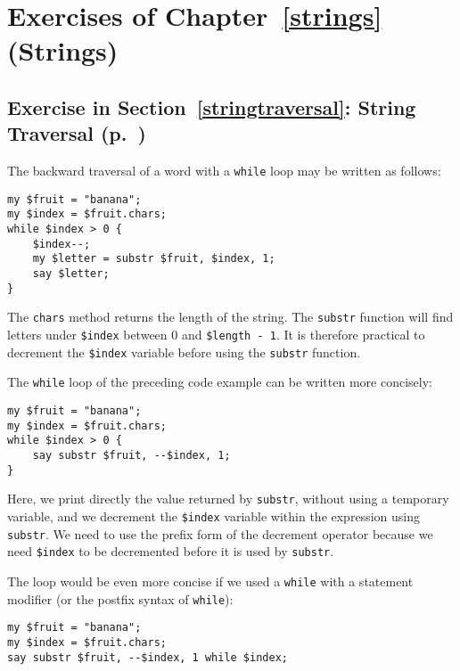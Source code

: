 \section{Exercises of Chapter~\ref{strings} (Strings)}

\subsection{Exercise in Section~\ref{stringtraversal}: String Traversal (p.~\pageref{stringtraversal})}
\label{sol_stringtraversal}

The backward traversal of a word with a {\tt while} loop may
be written as follows:

\begin{verbatim}
my $fruit = "banana";
my $index = $fruit.chars;
while $index > 0 { 
    $index--;
    my $letter = substr $fruit, $index, 1; 
    say $letter; 
}
\end{verbatim}
%

The {\tt chars} method returns the length of the string. The 
{\tt substr} function will find letters under \verb'$index' 
between 0 and \verb'$length - 1'. It is therefore practical 
to decrement the \verb'$index' variable before using the
{\tt substr} function. 

The \verb'while' loop of the preceding code example can be 
written more concisely:

\begin{verbatim}
my $fruit = "banana";
my $index = $fruit.chars;
while $index > 0 { 
    say substr $fruit, --$index, 1; 
}
\end{verbatim}
%

Here, we print directly the value returned by {\tt substr}, 
without using a temporary variable, and we decrement the 
\verb'$index' variable within the expression using {\tt substr}.
We need to use the prefix form of the decrement operator 
because we need \verb'$index' to be decremented before it is 
used by {\tt substr}.

The loop would be even more concise if we used a {\tt while} with 
a statement modifier (or the postfix syntax of {\tt while}):

\begin{verbatim}
my $fruit = "banana";
my $index = $fruit.chars;
say substr $fruit, --$index, 1 while $index;
\end{verbatim}
%


